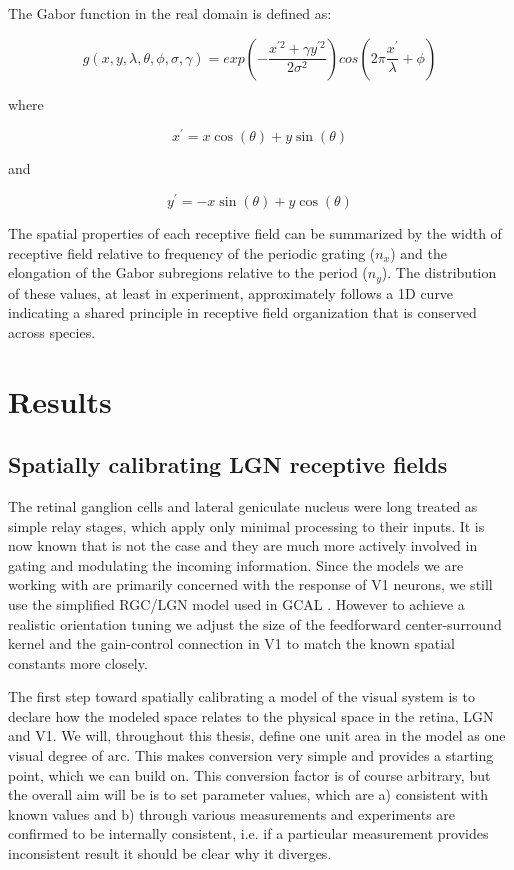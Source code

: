 The Gabor function in the real domain is defined as:

\begin{equation}
  g(x, y, \lambda, \theta, \phi, \sigma, \gamma) = exp(-\frac{x^{\prime 2} + \gamma y^{\prime 2}}{2\sigma^2}) cos(2 \pi \frac{x^\prime}{\lambda}+\phi)
\end{equation}

where

\begin{equation}
  x^\prime = x\cos(\theta) + y\sin(\theta)
\end{equation}

and

\begin{equation}
y^\prime = -x\sin(\theta) + y\cos(\theta)
\end{equation}

The spatial properties of each receptive field can be summarized by
the width of receptive field relative to frequency of the periodic
grating ($n_x$) and the elongation of the Gabor subregions relative to
the period ($n_y$). The distribution of these values, at least in
experiment, approximately follows a 1D curve indicating a shared
principle in receptive field organization that is conserved across
species.

\section{Results}

\subsection{Spatially calibrating LGN receptive fields}

The retinal ganglion cells and lateral geniculate nucleus were long
treated as simple relay stages, which apply only minimal processing to
their inputs. It is now known that is not the case and they are much
more actively involved in gating and modulating the incoming
information. Since the models we are working with are primarily
concerned with the response of V1 neurons, we still use the simplified
RGC/LGN model used in GCAL \citep{Stevens2013}. However to achieve a
realistic orientation tuning we adjust the size of the feedforward
center-surround kernel and the gain-control connection in V1 to match
the known spatial constants more closely.

The first step toward spatially calibrating a model of the visual
system is to declare how the modeled space relates to the physical
space in the retina, LGN and V1. We will, throughout this thesis,
define one unit area in the model as one visual degree of arc. This
makes conversion very simple and provides a starting point, which we
can build on. This conversion factor is of course arbitrary, but the
overall aim will be is to set parameter values, which are a)
consistent with known values and b) through various measurements and
experiments are confirmed to be internally consistent, i.e. if a
particular measurement provides inconsistent result it should be clear
why it diverges.

